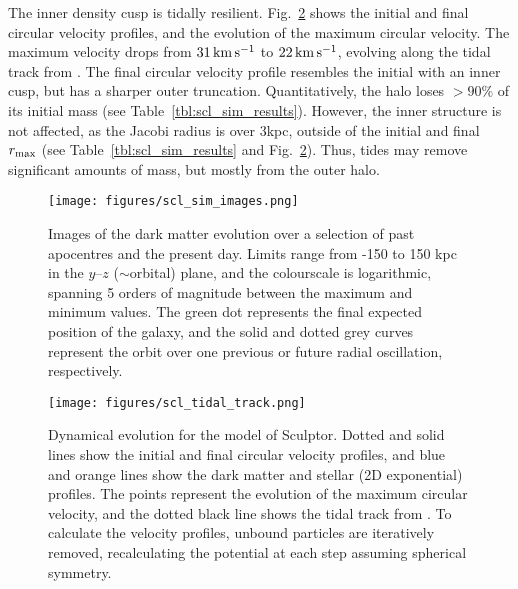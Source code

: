 The inner density cusp is tidally resilient.
Fig.~\ref{fig:scl_tidal_track} shows the initial and final circular
velocity profiles, and the evolution of the maximum circular velocity.
The maximum velocity drops from \(31\,{\rm km\,s^{-1}}\) to \(22\,{\rm km\,s^{-1}}\), evolving
along the tidal track from \citet{EN2021}. The final circular velocity
profile resembles the initial with an inner cusp, but has a sharper
outer truncation. Quantitatively, the halo loses \(>90\%\) of its
initial mass (see Table~\ref{tbl:scl_sim_results}). However, the inner
structure is not affected, as the Jacobi radius is over 3kpc, outside of
the initial and final \(r_{\rm max}\) (see Table~\ref{tbl:scl_sim_results} and
Fig.~\ref{fig:scl_tidal_track}). Thus, tides may remove significant
amounts of mass, but mostly from the outer halo.

\begin{figure}
\centering
\texttt{[image: figures/scl\_sim\_images.png]}
\caption[Sculptor simulation snapshots]{Images of the dark matter
evolution over a selection of past apocentres and the present day.
Limits range from -150 to 150 kpc in the \(y\)--\(z\) (\(\sim\)orbital)
plane, and the colourscale is logarithmic, spanning 5 orders of
magnitude between the maximum and minimum values. The green dot
represents the final expected position of the galaxy, and the solid and
dotted grey curves represent the orbit over one previous or future
radial oscillation, respectively.}\label{fig:scl_sim_images}
\end{figure}

\begin{figure}
\centering
\texttt{[image: figures/scl\_tidal\_track.png]}
\caption[Sculptor tidal tracks]{Dynamical evolution for the \smallperi{}
model of Sculptor. Dotted and solid lines show the initial and final
circular velocity profiles, and blue and orange lines show the dark
matter and stellar (2D exponential) profiles. The points represent the
evolution of the maximum circular velocity, and the dotted black line
shows the tidal track from \citet{EN2021}. To calculate the velocity
profiles, unbound particles are iteratively removed, recalculating the
potential at each step assuming spherical
symmetry.}\label{fig:scl_tidal_track}
\end{figure}

